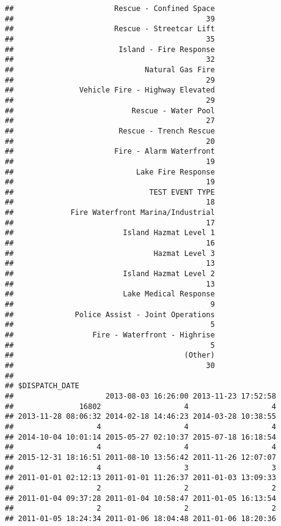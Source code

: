 \documentclass[]{article}
\begin{document}
\begin{verbatim}
##                       Rescue - Confined Space 
##                                            39 
##                       Rescue - Streetcar Lift 
##                                            35 
##                        Island - Fire Response 
##                                            32 
##                              Natural Gas Fire 
##                                            29 
##               Vehicle Fire - Highway Elevated 
##                                            29 
##                           Rescue - Water Pool 
##                                            27 
##                        Rescue - Trench Rescue 
##                                            20 
##                       Fire - Alarm Waterfront 
##                                            19 
##                            Lake Fire Response 
##                                            19 
##                               TEST EVENT TYPE 
##                                            18 
##             Fire Waterfront Marina/Industrial 
##                                            17 
##                         Island Hazmat Level 1 
##                                            16 
##                                Hazmat Level 3 
##                                            13 
##                         Island Hazmat Level 2 
##                                            13 
##                         Lake Medical Response 
##                                             9 
##              Police Assist - Joint Operations 
##                                             5 
##                  Fire - Waterfront - Highrise 
##                                             5 
##                                       (Other) 
##                                            30 
## 
## $DISPATCH_DATE
##                     2013-08-03 16:26:00 2013-11-23 17:52:58 
##               16802                   4                   4 
## 2013-11-28 08:06:32 2014-02-18 14:46:23 2014-03-28 10:38:55 
##                   4                   4                   4 
## 2014-10-04 10:01:14 2015-05-27 02:10:37 2015-07-18 16:18:54 
##                   4                   4                   4 
## 2015-12-31 18:16:51 2011-08-10 13:56:42 2011-11-26 12:07:07 
##                   4                   3                   3 
## 2011-01-01 02:12:13 2011-01-01 11:26:37 2011-01-03 13:09:33 
##                   2                   2                   2 
## 2011-01-04 09:37:28 2011-01-04 10:58:47 2011-01-05 16:13:54 
##                   2                   2                   2 
## 2011-01-05 18:24:34 2011-01-06 18:04:48 2011-01-06 18:20:36 

\end{verbatim}
\end{document}
